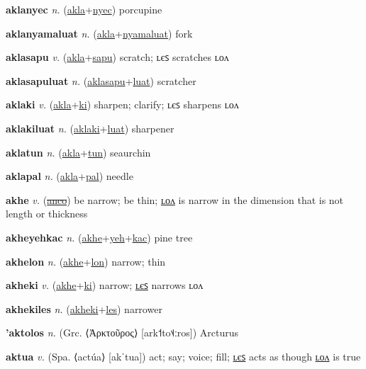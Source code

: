 \textbf{\hypertarget{aklanyec}{aklanyec}} \textit{n.} (\hyperlink{akla}{akla}+\allowbreak \hyperlink{nyec}{nyec})
porcupine

\textbf{\hypertarget{aklanyamaluat}{aklanyamaluat}} \textit{n.} (\hyperlink{akla}{akla}+\allowbreak \hyperlink{nyamaluat}{nyamaluat})
fork

\textbf{\hypertarget{aklasapu}{aklasapu}} \textit{v.} (\hyperlink{akla}{akla}+\allowbreak \hyperlink{sapu}{sapu})
scratch; ʟєꜱ scratches ʟᴏᴧ

\textbf{\hypertarget{aklasapuluat}{aklasapuluat}} \textit{n.} (\hyperlink{aklasapu}{aklasapu}+\allowbreak \hyperlink{luat}{luat})
scratcher

\textbf{\hypertarget{aklaki}{aklaki}} \textit{v.} (\hyperlink{akla}{akla}+\allowbreak \hyperlink{ki}{ki})
sharpen; clarify; ʟєꜱ sharpens ʟᴏᴧ

\textbf{\hypertarget{aklakiluat}{aklakiluat}} \textit{n.} (\hyperlink{aklaki}{aklaki}+\allowbreak \hyperlink{luat}{luat})
sharpener

\textbf{\hypertarget{aklatun}{aklatun}} \textit{n.} (\hyperlink{akla}{akla}+\allowbreak \hyperlink{tun}{tun})
seaurchin

\textbf{\hypertarget{aklapal}{aklapal}} \textit{n.} (\hyperlink{akla}{akla}+\allowbreak \hyperlink{pal}{pal})
needle

\textbf{\hypertarget{akhe}{akhe}} \textit{v.} (\hyperlink{anco}{\sout{anco}})
be narrow; be thin; \hyperlink{akhelon}{ʟᴏᴧ} is narrow in the dimension that is not length or thickness

\textbf{\hypertarget{akheyehkac}{akheyehkac}} \textit{n.} (\hyperlink{akhe}{akhe}+\allowbreak \hyperlink{yeh}{yeh}+\allowbreak \hyperlink{kac}{kac})
pine tree

\textbf{\hypertarget{akhelon}{akhelon}} \textit{n.} (\hyperlink{akhe}{akhe}+\allowbreak \hyperlink{lon}{lon})
narrow; thin

\textbf{\hypertarget{akheki}{akheki}} \textit{v.} (\hyperlink{akhe}{akhe}+\allowbreak \hyperlink{ki}{ki})
narrow; \hyperlink{akhekiles}{ʟєꜱ} narrows ʟᴏᴧ

\textbf{\hypertarget{akhekiles}{akhekiles}} \textit{n.} (\hyperlink{akheki}{akheki}+\allowbreak \hyperlink{les}{les})
narrower

\textbf{\hypertarget{'aktolos}{'aktolos}} \textit{n.} (Grc. ⟨Ἀρκτοῦρος⟩ [ark˦to˦˨ːros])
Arcturus

\textbf{\hypertarget{aktua}{aktua}} \textit{v.} (Spa. ⟨actúa⟩ [akˈtua])
act; say; voice; fill; \hyperlink{aktuales}{ʟєꜱ} acts as though \hyperlink{aktualon}{ʟᴏᴧ} is true

